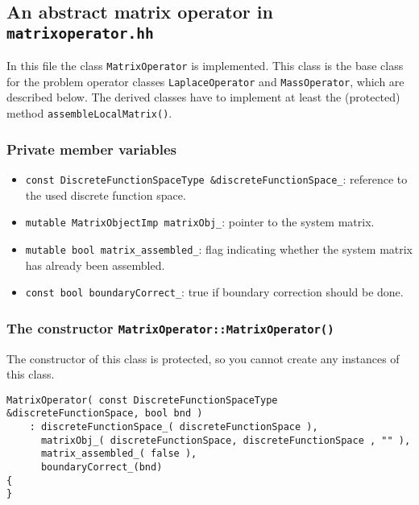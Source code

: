 \subsection{An abstract matrix operator in \texttt{matrixoperator.hh} }
In this file the class \texttt{MatrixOperator} is implemented. This class is the base class for the problem operator classes \texttt{LaplaceOperator} and \texttt{MassOperator}, which are described below. The derived classes have to implement at least the (protected) method \texttt{assembleLocalMatrix()}.

\subsubsection{Private member variables}
\begin{itemize}
 \item \lstinline!const DiscreteFunctionSpaceType &discreteFunctionSpace_!: reference to the used discrete function space.

 \item \lstinline!mutable MatrixObjectImp matrixObj_!: pointer to the system matrix.

 \item \lstinline!mutable bool matrix_assembled_!: flag indicating whether the system matrix has already been assembled.

 \item \lstinline!const bool boundaryCorrect_!: true if boundary correction should be done.
\end{itemize}


\subsubsection{The constructor \texttt{MatrixOperator::MatrixOperator()} }
The constructor of this class is protected, so you cannot create any instances of this class.
\begin{lstlisting}
MatrixOperator( const DiscreteFunctionSpaceType &discreteFunctionSpace, bool bnd )
    : discreteFunctionSpace_( discreteFunctionSpace ),
      matrixObj_( discreteFunctionSpace, discreteFunctionSpace , "" ),
      matrix_assembled_( false ),
      boundaryCorrect_(bnd)
{
}
\end{lstlisting}


